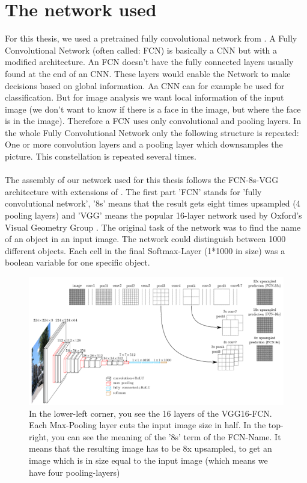 \section{The network used}
\label{sec:theFCN}
For this thesis, we used a pretrained fully convolutional network from \cite{nirkin2018_faceswap}. A Fully Convolutional Network (often called: FCN) is basically a CNN but with a modified architecture. An FCN doesn't have the fully connected layers usually found at the end of an CNN. These layers would enable the Network to make decisions based on global information. Aa CNN can for example be used for classification. But for image analysis we want local information of the input image (we don't want to know if there is a face in the image, but where the face is in the image). Therefore a FCN uses only convolutional and pooling layers. In the whole Fully Convolutional Network only the following structure is repeated: One or more convolution layers and a pooling layer which downsamples the picture. This constellation is repeated several times.\\
\\
The assembly of our network used for this thesis follows the FCN-8s-VGG architecture with extensions of \cite{jlong}. The first part 'FCN' stands for 'fully convolutional network', '8s' means that the result gets eight times upsampled (4 pooling layers) and 'VGG' means the popular 16-layer network used by Oxford's Visual Geometry Group \cite{ksimonyan}. The original task of the network was to find the name of an object in an input image. The network could distinguish between 1000 different objects. Each cell in the final Softmax-Layer (1*1000 in size) was a boolean variable for one specific object.

\begin{figure}
	\centering
	\includegraphics[width=1\linewidth]{Figures/fcn_1.png}
	\caption{In the lower-left corner, you see the 16 layers of the VGG16-FCN. Each Max-Pooling layer cuts the input image size in half. In the top-right, you can see the meaning of the '8s' term of the FCN-Name. It means that the resulting image has to be 8x upsampled, to get an image which is in size equal to the input image (which means we have four pooling-layers)}
\end{figure}


